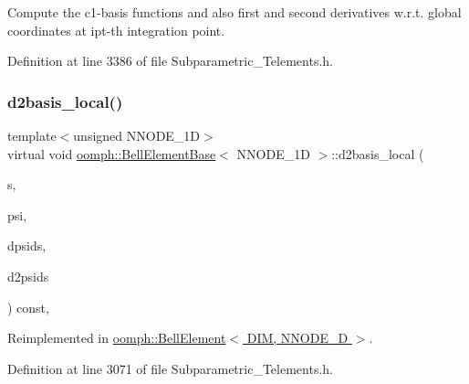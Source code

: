 Compute the c1-\/basis functions and also first and second derivatives w.\+r.\+t. global coordinates at ipt-\/th integration point. 



Definition at line 3386 of file Subparametric\+\_\+\+Telements.\+h.

\mbox{\label{classoomph_1_1BellElementBase_ac6c1add4a996cf149da6c85ee3f4b637}} 
\subsubsection{\texorpdfstring{d2basis\+\_\+local()}{d2basis\_local()}}
{\footnotesize\ttfamily template$<$unsigned N\+N\+O\+D\+E\+\_\+1D$>$ \\
virtual void \hyperlink{classoomph_1_1BellElementBase}{oomph\+::\+Bell\+Element\+Base}$<$ N\+N\+O\+D\+E\+\_\+1D $>$\+::d2basis\+\_\+local (\begin{DoxyParamCaption}\item[{const \hyperlink{classoomph_1_1Vector}{Vector}$<$ double $>$ \&}]{s,  }\item[{\hyperlink{classoomph_1_1Shape}{Shape} \&}]{psi,  }\item[{\hyperlink{classoomph_1_1DShape}{D\+Shape} \&}]{dpsids,  }\item[{\hyperlink{classoomph_1_1DShape}{D\+Shape} \&}]{d2psids }\end{DoxyParamCaption}) const\hspace{0.3cm}{\ttfamily [inline]}, {\ttfamily [virtual]}}



Reimplemented in \hyperlink{classoomph_1_1BellElement_a58254e48913aa6428db33338b010a911}{oomph\+::\+Bell\+Element$<$ D\+I\+M, N\+N\+O\+D\+E\+\_\+D $>$}.



Definition at line 3071 of file Subparametric\+\_\+\+Telements.\+h.

\mbox{\label{classoomph_1_1BellElementBase_ae5a43211398722298cf88ded87dee6ab}} 
